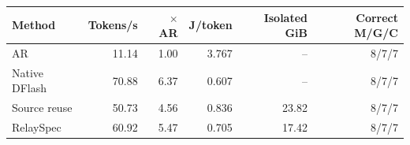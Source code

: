 \begin{tabular}{lrrrrr}
\toprule
Method & Tokens/s & $\times$ AR & J/token & Isolated GiB & Correct M/G/C \\
\midrule
AR & 11.14 & 1.00 & 3.767 & -- & 8/7/7 \\
Native DFlash & 70.88 & 6.37 & 0.607 & -- & 8/7/7 \\
Source reuse & 50.73 & 4.56 & 0.836 & 23.82 & 8/7/7 \\
RelaySpec & 60.92 & 5.47 & 0.705 & 17.42 & 8/7/7 \\
\bottomrule
\end{tabular}

